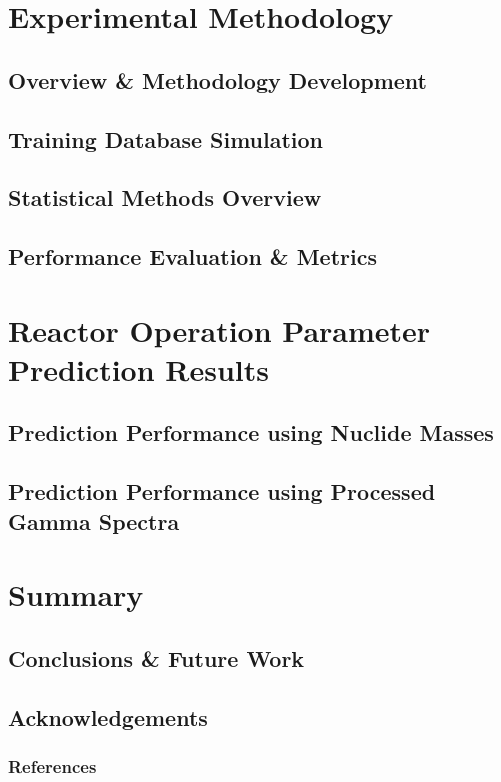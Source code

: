 \documentclass[10pt]{beamer}
\begin{document}
\section{Experimental Methodology}
\subsection{Overview \& Methodology Development}

\subsection{Training Database Simulation}

\subsection{Statistical Methods Overview}

\subsection{Performance Evaluation \& Metrics}


\section{Reactor Operation Parameter Prediction Results}
\subsection{Prediction Performance using Nuclide Masses}

\subsection{Prediction Performance using Processed Gamma Spectra}


\section{Summary}
\subsection{Conclusions \& Future Work}

\subsection{Acknowledgements}



\begin{frame}[allowframebreaks]
  \frametitle{References}
  
  {\footnotesize  }
\end{frame}

\end{document}
